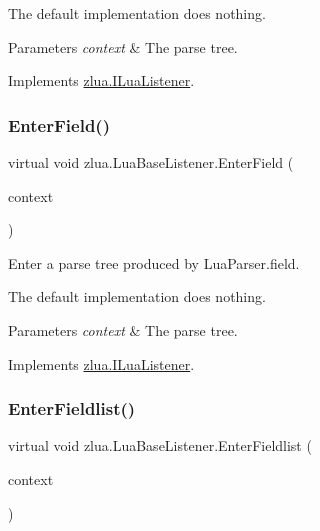 The default implementation does nothing.


\begin{DoxyParams}{Parameters}
{\em context} & The parse tree.\\
\hline
\end{DoxyParams}


Implements \mbox{\hyperlink{interfacezlua_1_1_i_lua_listener_acaeea04a84e6859bedcaa48c486cb640}{zlua.\+I\+Lua\+Listener}}.

\mbox{\label{classzlua_1_1_lua_base_listener_a6bfe7b609f8393a7987e3746efa50769}} 
\subsubsection{\texorpdfstring{Enter\+Field()}{EnterField()}}
{\footnotesize\ttfamily virtual void zlua.\+Lua\+Base\+Listener.\+Enter\+Field (\begin{DoxyParamCaption}\item[{\mbox{[}\+Not\+Null\mbox{]} \mbox{\hyperlink{classzlua_1_1_lua_parser_1_1_field_context}{Lua\+Parser.\+Field\+Context}}}]{context }\end{DoxyParamCaption})\hspace{0.3cm}{\ttfamily [virtual]}}



Enter a parse tree produced by Lua\+Parser.\+field. 

The default implementation does nothing.


\begin{DoxyParams}{Parameters}
{\em context} & The parse tree.\\
\hline
\end{DoxyParams}


Implements \mbox{\hyperlink{interfacezlua_1_1_i_lua_listener_abd670dc230362e0d50ad8dfffd50eb61}{zlua.\+I\+Lua\+Listener}}.

\mbox{\label{classzlua_1_1_lua_base_listener_a099787479e7da4a336dce23de123fa0a}} 
\subsubsection{\texorpdfstring{Enter\+Fieldlist()}{EnterFieldlist()}}
{\footnotesize\ttfamily virtual void zlua.\+Lua\+Base\+Listener.\+Enter\+Fieldlist (\begin{DoxyParamCaption}\item[{\mbox{[}\+Not\+Null\mbox{]} \mbox{\hyperlink{classzlua_1_1_lua_parser_1_1_fieldlist_context}{Lua\+Parser.\+Fieldlist\+Context}}}]{context }\end{DoxyParamCaption})\hspace{0.3cm}{\ttfamily [virtual]}}



